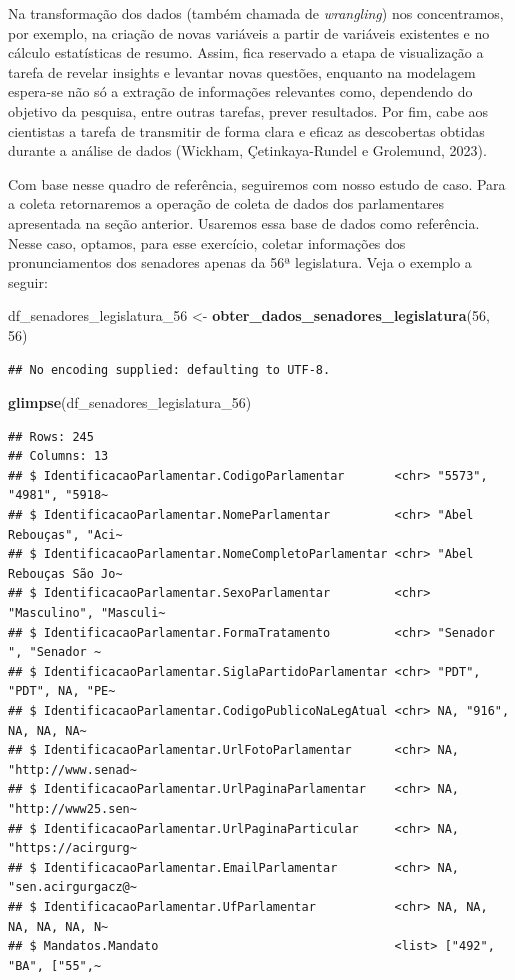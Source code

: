 \documentclass{article}
\newenvironment{Shaded}{\begin{snugshade}}{\end{snugshade}}
\newcommand{\DecValTok}[1]{\textcolor[rgb]{0.00,0.00,0.81}{#1}}
\newcommand{\FunctionTok}[1]{\textcolor[rgb]{0.13,0.29,0.53}{\textbf{#1}}}
\newcommand{\NormalTok}[1]{#1}
\newcommand{\OtherTok}[1]{\textcolor[rgb]{0.56,0.35,0.01}{#1}}
\begin{document}
Na transformação dos dados (também chamada de \emph{wrangling}) nos
concentramos, por exemplo, na criação de novas variáveis a partir de
variáveis existentes e no cálculo estatísticas de resumo. Assim, fica
reservado a etapa de visualização a tarefa de revelar insights e
levantar novas questões, enquanto na modelagem espera-se não só a
extração de informações relevantes como, dependendo do objetivo da
pesquisa, entre outras tarefas, prever resultados. Por fim, cabe aos
cientistas a tarefa de transmitir de forma clara e eficaz as descobertas
obtidas durante a análise de dados (Wickham, Çetinkaya-Rundel e
Grolemund, 2023).

Com base nesse quadro de referência, seguiremos com nosso estudo de
caso. Para a coleta retornaremos a operação de coleta de dados dos
parlamentares apresentada na seção anterior. Usaremos essa base de dados
como referência. Nesse caso, optamos, para esse exercício, coletar
informações dos pronunciamentos dos senadores apenas da 56ª legislatura.
Veja o exemplo a seguir:

\begin{Shaded}
\begin{Highlighting}[]
\NormalTok{df\_senadores\_legislatura\_56 }\OtherTok{\textless{}{-}} \FunctionTok{obter\_dados\_senadores\_legislatura}\NormalTok{(}\DecValTok{56}\NormalTok{, }\DecValTok{56}\NormalTok{)}
\end{Highlighting}
\end{Shaded}

\begin{verbatim}
## No encoding supplied: defaulting to UTF-8.
\end{verbatim}

\begin{Shaded}
\begin{Highlighting}[]
\FunctionTok{glimpse}\NormalTok{(df\_senadores\_legislatura\_56)}
\end{Highlighting}
\end{Shaded}

\begin{verbatim}
## Rows: 245
## Columns: 13
## $ IdentificacaoParlamentar.CodigoParlamentar       <chr> "5573", "4981", "5918~
## $ IdentificacaoParlamentar.NomeParlamentar         <chr> "Abel Rebouças", "Aci~
## $ IdentificacaoParlamentar.NomeCompletoParlamentar <chr> "Abel Rebouças São Jo~
## $ IdentificacaoParlamentar.SexoParlamentar         <chr> "Masculino", "Masculi~
## $ IdentificacaoParlamentar.FormaTratamento         <chr> "Senador ", "Senador ~
## $ IdentificacaoParlamentar.SiglaPartidoParlamentar <chr> "PDT", "PDT", NA, "PE~
## $ IdentificacaoParlamentar.CodigoPublicoNaLegAtual <chr> NA, "916", NA, NA, NA~
## $ IdentificacaoParlamentar.UrlFotoParlamentar      <chr> NA, "http://www.senad~
## $ IdentificacaoParlamentar.UrlPaginaParlamentar    <chr> NA, "http://www25.sen~
## $ IdentificacaoParlamentar.UrlPaginaParticular     <chr> NA, "https://acirgurg~
## $ IdentificacaoParlamentar.EmailParlamentar        <chr> NA, "sen.acirgurgacz@~
## $ IdentificacaoParlamentar.UfParlamentar           <chr> NA, NA, NA, NA, NA, N~
## $ Mandatos.Mandato                                 <list> ["492", "BA", ["55",~
\end{verbatim}
\end{document}
